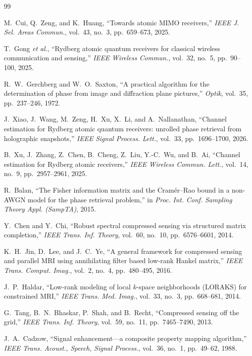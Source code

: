 \documentclass[journal]{IEEEtran}
\begin{document}
\begin{thebibliography}{99}

M.~Cui, Q.~Zeng, and K.~Huang,
``Towards atomic MIMO receivers,''
\emph{IEEE J. Sel. Areas Commun.},
vol.~43, no.~3, pp.~659--673, 2025.

T.~Gong \emph{et al.},
``Rydberg atomic quantum receivers for classical wireless communication and sensing,''
\emph{IEEE Wireless Commun.},
vol.~32, no.~5, pp.~90--100, 2025.

R.~W.~Gerchberg and W.~O.~Saxton,
``A practical algorithm for the determination of phase from image and diffraction plane pictures,''
\emph{Optik},
vol.~35, pp.~237--246, 1972.

J.~Xiao, J.~Wang, M.~Zeng, H.~Xu, X.~Li, and A.~Nallanathan,
``Channel estimation for Rydberg atomic quantum receivers:
unrolled phase retrieval from holographic snapshots,''
\emph{IEEE Signal Process. Lett.},
vol.~33, pp.~1696--1700, 2026.

B.~Xu, J.~Zhang, Z.~Chen, B.~Cheng, Z.~Liu, Y.-C.~Wu, and B.~Ai,
``Channel estimation for Rydberg atomic receivers,''
\emph{IEEE Wireless Commun. Lett.},
vol.~14, no.~9, pp.~2957--2961, 2025.

R.~Balan,
``The Fisher information matrix and the Cram\'er--Rao bound in a non-AWGN model for the phase retrieval problem,''
in \emph{Proc. Int. Conf. Sampling Theory Appl. (SampTA)},
2015.

Y.~Chen and Y.~Chi,
``Robust spectral compressed sensing via structured matrix completion,''
\emph{IEEE Trans. Inf. Theory},
vol.~60, no.~10, pp.~6576--6601, 2014.

K.~H.~Jin, D.~Lee, and J.~C.~Ye,
``A general framework for compressed sensing and parallel MRI using annihilating filter based low-rank Hankel matrix,''
\emph{IEEE Trans. Comput. Imag.},
vol.~2, no.~4, pp.~480--495, 2016.

J.~P.~Haldar,
``Low-rank modeling of local $k$-space neighborhoods (LORAKS) for constrained MRI,''
\emph{IEEE Trans. Med. Imag.},
vol.~33, no.~3, pp.~668--681, 2014.

G.~Tang, B.~N.~Bhaskar, P.~Shah, and B.~Recht,
``Compressed sensing off the grid,''
\emph{IEEE Trans. Inf. Theory},
vol.~59, no.~11, pp.~7465--7490, 2013.

J.~A.~Cadzow,
``Signal enhancement---a composite property mapping algorithm,''
\emph{IEEE Trans. Acoust., Speech, Signal Process.},
vol.~36, no.~1, pp.~49--62, 1988.


\end{thebibliography}
\end{document}
